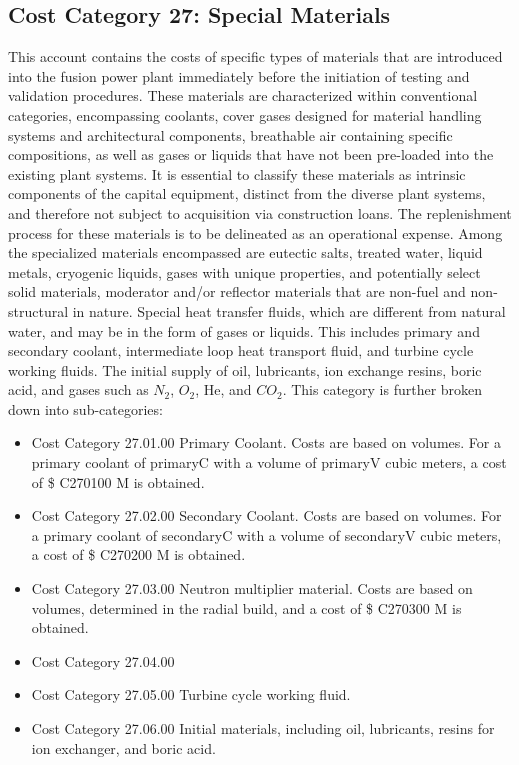\subsection{Cost Category 27: Special Materials}

This account contains the costs of specific types of materials that are introduced into the fusion power plant immediately before the initiation of testing and validation procedures. These materials are characterized within conventional categories, encompassing coolants, cover gases designed for material handling systems and architectural components, breathable air containing specific compositions, as well as gases or liquids that have not been pre-loaded into the existing plant systems. It is essential to classify these materials as intrinsic components of the capital equipment, distinct from the diverse plant systems, and therefore not subject to acquisition via construction loans. The replenishment process for  these materials is to be delineated as an operational expense. Among the specialized materials encompassed are eutectic salts, treated water, liquid metals,  cryogenic liquids, gases with unique properties, and potentially select solid materials, moderator and/or reflector materials that are non-fuel and non-structural in nature. Special heat transfer fluids, which are different from natural water, and may be in the form of gases or liquids. This includes primary and secondary coolant, intermediate loop heat transport fluid, and turbine cycle working fluids. The initial supply of oil, lubricants, ion exchange resins, boric acid, and gases such as $N_2$, $O_2$, He, and $CO_2$.
This category is further broken down into sub-categories:

\begin{itemize}
    \item Cost Category 27.01.00 Primary Coolant. Costs are based on volumes. For a primary coolant of primaryC with a volume of primaryV cubic meters, a cost of \$ C270100 M is obtained.  
    \item Cost Category 27.02.00 Secondary Coolant. Costs are based on volumes. For a primary coolant of secondaryC with a volume of secondaryV cubic meters, a cost of \$ C270200 M is obtained.
    \item Cost Category 27.03.00 Neutron multiplier material.  Costs are based on volumes, determined in the radial build, and a cost of \$ C270300 M is obtained.
    \item Cost Category 27.04.00   
    \item Cost Category 27.05.00 Turbine cycle working fluid.
    \item Cost Category 27.06.00 Initial materials, including oil, lubricants, resins for ion exchanger, and boric acid.
\end{itemize}

